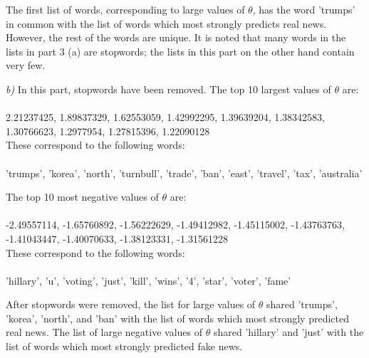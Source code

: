\documentclass{article}
\begin{document}
The first list of words, corresponding to large values of $\theta$, has the word 'trumps' in common with the list of words which most strongly predicts real news. However, the rest of the words are unique. It is noted that many words in the lists in part 3 (a) are stopwords; the lists in this part on the other hand contain very few.


\textit{b)}
In this part, stopwords have been removed. The top 10 largest values of $\theta$ are:\\\\
2.21237425, 1.89837329, 1.62553059, 1.42992295, 1.39639204, 1.38342583, 1.30766623, 1.2977954,  1.27815396, 1.22090128\\
 
 These correspond to the following words:\\\\
 'trumps', 'korea', 'north', 'turnbull', 'trade', 'ban', 'east', 'travel', 'tax', 'australia'
 
 The top 10 most negative values of $\theta$ are:\\\\
 -2.49557114, -1.65760892, -1.56222629, -1.49412982, -1.45115002, -1.43763763, -1.41043447, -1.40070633, -1.38123331, -1.31561228\\
 
 These correspond to the following words:\\\\
 'hillary', 'u', 'voting', 'just', 'kill', 'wins', '4', 'star', 'voter', 'fame'
 
After stopwords were removed, the list for large values of $\theta$ shared 'trumps', 'korea', 'north', and 'ban' with the list of words which most strongly predicted real news. The list of large negative values of $\theta$ shared 'hillary' and 'just' with the list of words which most strongly predicted fake news.
\end{document}

